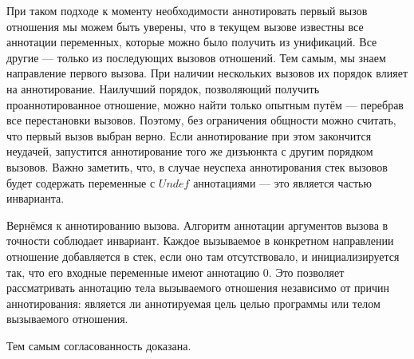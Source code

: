 При таком подходе к моменту необходимости аннотировать первый вызов отношения мы можем быть уверены, что в текущем вызове известны все аннотации переменных, которые можно было получить из унификаций.
Все другие --- только из последующих вызовов отношений.
Тем самым, мы знаем направление первого вызова.
При наличии нескольких вызовов их порядок влияет на аннотирование.
Наилучший порядок, позволяющий получить проаннотированное отношение, можно найти только опытным путём --- перебрав все перестановки вызовов.
Поэтому, без ограничения общности можно считать, что первый вызов выбран верно.
Если аннотирование при этом закончится неудачей, запустится аннотирование того же дизъюнкта с другим порядком вызовов.
Важно заметить, что, в случае неуспеха аннотирования стек вызовов будет содержать переменные с $Undef$ аннотациями --- это является частью инварианта.

Вернёмся к аннотированию вызова.
Алгоритм аннотации аргументов вызова в точности соблюдает инвариант.
Каждое вызываемое в конкретном направлении отношение добавляется в стек, если оно там отсутствовало, и инициализируется так, что его входные переменные имеют аннотацию $0$.
Это позволяет рассматривать аннотацию тела вызываемого отношения независимо от причин аннотирования: является ли аннотируемая цель целью программы или телом вызываемого отношения.

Тем самым согласованность доказана.